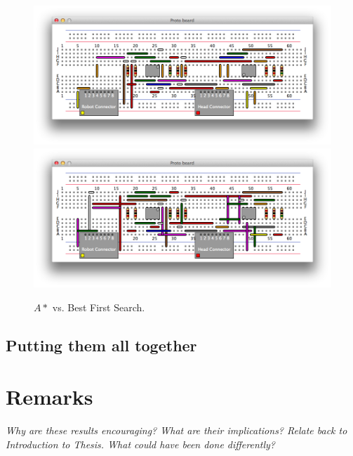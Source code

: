 \begin{figure}
\begin{center}
\includegraphics[width=\textwidth]{Images/exemplar_per_pair_decreasing.png}
\includegraphics[width=\textwidth]{Images/exemplar_best_first.png}
\caption{$A*$ vs. Best First Search.}
\end{center}
\end{figure}

\subsection{Putting them all together}
\label{sec:method_combination}

\section{Remarks}

\textit{Why are these results encouraging? What are their implications? Relate
back to Introduction to Thesis. What could have been done differently?}
